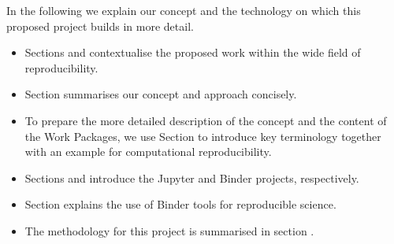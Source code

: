 In the following we explain our concept and the technology on which this
proposed project builds in more detail.
\begin{itemize}
\item Sections  and
   contextualise the proposed work
  within the wide field of reproducibility.
\item Section  summarises our concept and
  approach concisely.

\item To prepare the more detailed description of the concept and the content of
  the Work Packages, we use Section
   to introduce key terminology
  together with an example for computational reproducibility.

\item Sections  and 
  introduce the Jupyter and Binder projects, respectively.

\item Section  explains the use of
  Binder tools for reproducible science.

\item The methodology for this project is summarised in section
  .

\end{itemize}


%
%
%
%
%
%
%
%

